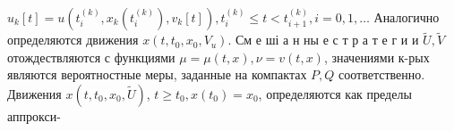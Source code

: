 \documentclass[10pt]{article}
\begin{document}
$u_{k}[t]=u\left(t_{i}^{(k)}, x_{k}\left(t_{i}^{(k)}\right), v_{k}[t]\right), t_{i}^{(k)} \leqslant t<t_{i+1}^{(k)}, i=0,1, \ldots$ Аналогично определяются движения $x\left(t, t_{0}, x_{0}, V_{u}\right)$. См е ші а н ны е с т р а т е г и и $\tilde{U}, \tilde{V}$ отождествляются с функциями $\mu=\mu(t, x), \nu=v(t, x)$, значениями к-рых являются вероятностные меры, заданные на компактах $P, Q$ соответственно. Движения $x\left(t, t_{0}, x_{0}, \tilde{U}\right)$, $t \geqslant t_{0}, x\left(t_{0}\right)=x_{0}$, определяются как пределы аппрокси-
\end{document}
